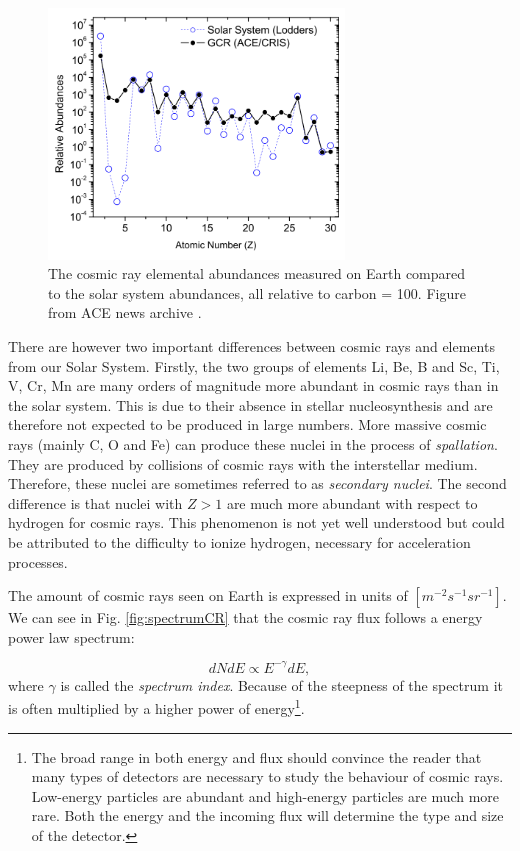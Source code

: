 \begin{figure}
\label{fig:relabundance}
\centering
\includegraphics[width=0.7\textwidth]{./chapter3/img/relativeabundanceACE.png}
\caption{The cosmic ray elemental abundances measured on Earth compared to the solar system abundances, all relative to carbon = 100. Figure from ACE news archive \cite{ISRAEL2005201}.}
\end{figure}
There are however two important differences between cosmic rays and elements from our Solar System. Firstly, the two groups of elements Li, Be, B and Sc, Ti, V, Cr, Mn are many orders of magnitude more abundant in cosmic rays than in the solar system. This is due to their absence in stellar nucleosynthesis and are therefore not expected to be produced in large numbers. More massive cosmic rays (mainly C, O and Fe) can produce these nuclei in the process of \textit{spallation}. They are produced by collisions of cosmic rays with the interstellar medium. Therefore, these nuclei are sometimes referred to as \textit{secondary nuclei}.
The second difference is that nuclei with $Z>1$ are much more abundant with respect to hydrogen for cosmic rays. This phenomenon is not yet well understood but could be attributed to the difficulty to ionize hydrogen, necessary for acceleration processes.

The amount of cosmic rays seen on Earth is expressed in units of $\left[m^{-2} s^{-1} sr^{-1}\right]$. We can see in Fig. \ref{fig:spectrumCR} that the cosmic ray flux follows a energy power law spectrum:

\begin{equation}
\label{eq:spectrum}
dNdE \varpropto E^{-\gamma} dE,
\end{equation} 
where $\gamma$ is called the \textit{spectrum index}. Because of the steepness of the spectrum it is often multiplied by a higher power of energy\footnote{The broad range in both energy and flux should convince the reader that many types of detectors are necessary to study the behaviour of cosmic rays. Low-energy particles are abundant and high-energy particles are much more rare. Both the energy and the incoming flux will determine the type and size of the detector.}.

